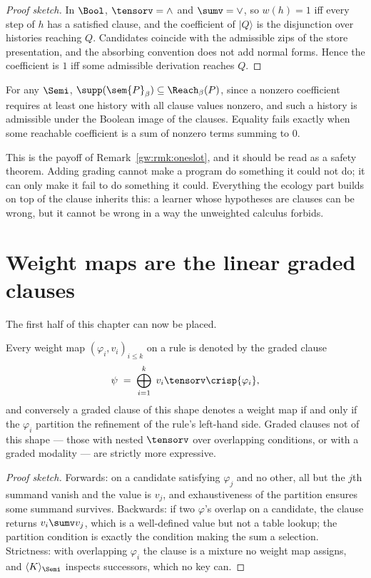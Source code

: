 \begin{proof}[Proof sketch]
In $\Bool$, $\tensorv = \wedge$ and $\sumv = \vee$, so $w(h) = 1$ iff every step of $h$
has a satisfied clause, and the coefficient of $\lvert Q\rangle$ is the disjunction over
histories reaching $Q$. Candidates coincide with the admissible zips of the store
presentation, and the absorbing convention does not add normal forms. Hence the
coefficient is $1$ iff some admissible derivation reaches $Q$.
\end{proof}

\begin{corollary}
\label{gw:cor:adequacy}
For any $\Semi$, $\supp(\sem{P}_\beta) \subseteq \Reach_\beta(P)$, since a nonzero
coefficient requires at least one history with all clause values nonzero, and such a
history is admissible under the Boolean image of the clauses. Equality fails exactly when
some reachable coefficient is a sum of nonzero terms summing to $0$.
\end{corollary}

This is the payoff of Remark~\ref{gw:rmk:oneslot}, and it should be read as a safety
theorem. Adding grading cannot make a program do something it could not do; it can only
make it fail to do something it could. Everything the ecology part builds on top of the
clause inherits this: a learner whose hypotheses are clauses can be wrong, but it cannot
be wrong in a way the unweighted calculus forbids.

\section{Weight maps are the linear graded clauses}
\label{gw:sec:dnf}

The first half of this chapter can now be placed.

\begin{theorem}
\label{gw:thm:dnf}
Every weight map $(\varphi_i, v_i)_{i\leq k}$ on a rule is denoted by the graded clause
\[
  \psi \;=\; \bigoplus_{i=1}^{k} \; v_i \tensorv \crisp{\varphi_i},
\]
and conversely a graded clause of this shape denotes a weight map if and only if the
$\varphi_i$ partition the refinement of the rule's left-hand side. Graded clauses not of
this shape --- those with nested $\tensorv$ over overlapping conditions, or with a graded
modality --- are strictly more expressive.
\end{theorem}

\begin{proof}[Proof sketch]
Forwards: on a candidate satisfying $\varphi_j$ and no other, all but the $j$th summand
vanish and the value is $v_j$, and exhaustiveness of the partition ensures some summand
survives. Backwards: if two $\varphi$'s overlap on a candidate, the clause returns
$v_i \sumv v_j$, which is a well-defined value but not a table lookup; the partition
condition is exactly the condition making the sum a selection. Strictness: with
overlapping $\varphi_i$ the clause is a mixture no weight map assigns, and
$\langle K\rangle_{\Semi}$ inspects successors, which no key can.
\end{proof}

